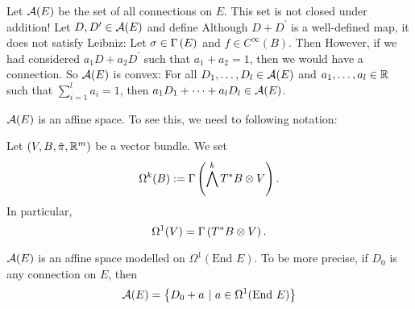 \documentclass[main.tex]{subfiles}
\begin{document}
    Let $\mathcal{A}(E)$ be the set of all connections on $E$. This set is not closed under addition! Let $D, D^\prime \in \mathcal{A}(E)$ and define
     Although $D + D^\prime$ is a well-defined map, it does not satisfy Leibniz: Let $\sigma \in \Gamma\left( E \right)$ and $f \in C^\infty(B)$. Then
    However, if we had considered $a_1 D + a_2 D^\prime$ such that $a_1 + a_2 = 1$, then we would have a connection. So $\mathcal{A}(E)$ is convex: For all $D_1, \dots, D_l \in \mathcal{A}(E)$ and $a_1, \dots, a_l \in \mathbb{R}$ such that $\sum_{i=1}^l a_i = 1$, then $a_1D_1 + \dots + a_l D_l \in \mathcal{A}(E)$.

    $\mathcal{A}(E)$ is an affine space. To see this, we need to following notation:

    \begin{notation}
    Let $(V, B, \tilde{\pi}, \mathbb{R}^m)$ be a vector bundle. We set
    \[
    \Omega^k(B) := \Gamma\left( \bigwedge^k T^*B \otimes V \right).
    \] In particular,
    \[
    \Omega^1(V) = \Gamma\left( T^*B \otimes V \right).
    \]
    \end{notation}

    \begin{prop}
    $\mathcal{A}(E)$ is an affine space modelled on $\Omega^1(\text{End }E)$. To be more precise, if $D_0$ is any connection on $E$, then
    \[
    \mathcal{A}(E) = \left\{ D_0 + a \ | \  a \in \Omega^1(\text{End } E) \right\}
    \]
    \end{prop}
\end{document}
